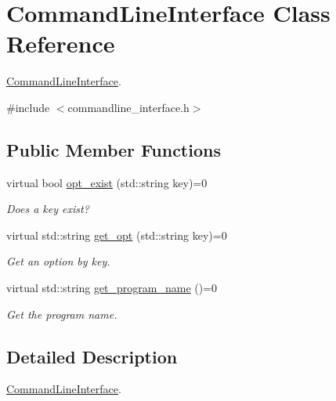 \hypertarget{classCommandLineInterface}{}\section{Command\+Line\+Interface Class Reference}
\label{classCommandLineInterface}


\hyperlink{classCommandLineInterface}{Command\+Line\+Interface}.  




{\ttfamily \#include $<$commandline\+\_\+interface.\+h$>$}

\subsection*{Public Member Functions}
\begin{DoxyCompactItemize}
\item 
virtual bool \hyperlink{classCommandLineInterface_a4ee445b7c34f27b7fc9d265d88e5d82a}{opt\+\_\+exist} (std\+::string key)=0\hypertarget{classCommandLineInterface_a4ee445b7c34f27b7fc9d265d88e5d82a}{}\label{classCommandLineInterface_a4ee445b7c34f27b7fc9d265d88e5d82a}

\begin{DoxyCompactList}\small\item\em Does a key exist? \end{DoxyCompactList}\item 
virtual std\+::string \hyperlink{classCommandLineInterface_a12399397b591b0eb779caad05947f800}{get\+\_\+opt} (std\+::string key)=0\hypertarget{classCommandLineInterface_a12399397b591b0eb779caad05947f800}{}\label{classCommandLineInterface_a12399397b591b0eb779caad05947f800}

\begin{DoxyCompactList}\small\item\em Get an option by key. \end{DoxyCompactList}\item 
virtual std\+::string \hyperlink{classCommandLineInterface_a47bd2a11bc8d8f507a7f75dbef36a3c9}{get\+\_\+program\+\_\+name} ()=0
\begin{DoxyCompactList}\small\item\em Get the program name. \end{DoxyCompactList}\end{DoxyCompactItemize}


\subsection{Detailed Description}
\hyperlink{classCommandLineInterface}{Command\+Line\+Interface}. 

